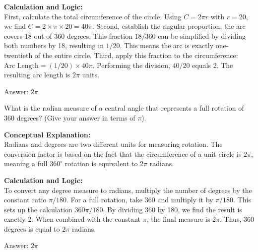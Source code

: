 \documentclass[11pt,paper=a4,answers]{exam}
\begin{document}
\begin{questions}
\begin{solution}
\vspace{30pt}

\textbf{Calculation and Logic:} \\
First, calculate the total circumference of the circle. Using $C = 2\pi r$ with $r = 20$, we find $C = 2 \times \pi \times 20 = 40\pi$. Second, establish the angular proportion: the arc covers $18$ out of $360$ degrees. This fraction $18 / 360$ can be simplified by dividing both numbers by 18, resulting in $1 / 20$. This means the arc is exactly one-twentieth of the entire circle. Third, apply this fraction to the circumference: $\text{Arc Length} = (1 / 20) \times 40\pi$. Performing the division, $40 / 20$ equals 2. The resulting arc length is $2\pi$ units.

\vspace{30pt}

Answer: \colorbox{yellow!100}{$2\pi$}
\end{solution}

\vspace{60pt}

\question
What is the radian measure of a central angle that represents a full rotation of 360 degrees? (Give your answer in terms of $\pi$).

\begin{solution}
\textbf{Conceptual Explanation:} \\
Radians and degrees are two different units for measuring rotation. The conversion factor is based on the fact that the circumference of a unit circle is $2\pi$, meaning a full $360^\circ$ rotation is equivalent to $2\pi$ radians.

\vspace{30pt}

\textbf{Calculation and Logic:} \\
To convert any degree measure to radians, multiply the number of degrees by the constant ratio $\pi / 180$. For a full rotation, take $360$ and multiply it by $\pi / 180$. This sets up the calculation $360\pi / 180$. By dividing 360 by 180, we find the result is exactly 2. When combined with the constant $\pi$, the final measure is $2\pi$. Thus, 360 degrees is equal to $2\pi$ radians.

\vspace{30pt}

Answer: \colorbox{yellow!100}{$2\pi$}
\end{solution}


\end{questions}
\end{document}
